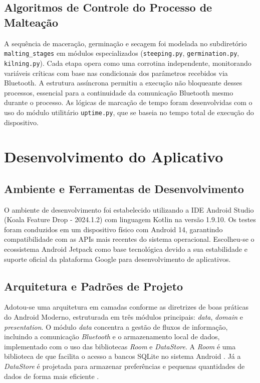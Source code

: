 \subsection{Algoritmos de Controle do Processo de Malteação}
A sequência de maceração, germinação e secagem foi modelada no subdiretório \texttt{malting\_stages} em módulos especializados (\texttt{steeping.py}, \texttt{germination.py}, \texttt{kilning.py}). Cada etapa opera como uma corrotina independente, monitorando variáveis críticas com base nas condicionais dos parâmetros recebidos via Bluetooth. A estrutura assíncrona permitiu a execução não bloqueante desses processos, essencial para a continuidade da comunicação Bluetooth mesmo durante o processo. As lógicas de marcação de tempo foram desenvolvidas com o uso do módulo utilitário \texttt{uptime.py}, que se baseia no tempo total de execução do dispositivo.

\section{Desenvolvimento do Aplicativo}
\subsection{Ambiente e Ferramentas de Desenvolvimento}

O ambiente de desenvolvimento foi estabelecido utilizando a IDE Android Studio (Koala Feature Drop - 2024.1.2) com linguagem Kotlin na versão 1.9.10. Os testes foram conduzidos em um dispositivo físico com Android 14, garantindo compatibilidade com as APIs mais recentes do sistema operacional. Escolheu-se o ecossistema Android Jetpack como base tecnológica devido a sua estabilidade e suporte oficial da plataforma Google para desenvolvimento de aplicativos.

\subsection{Arquitetura e Padrões de Projeto}

Adotou-se uma arquitetura em camadas conforme as diretrizes de boas práticas do Android Moderno, estruturada em três módulos principais: \textit{data}, \textit{domain} e \textit{presentation}. O módulo \textit{data} concentra a gestão de fluxos de informação, incluindo a comunicação \textit{Bluetooth} e o armazenamento local de dados, implementado com o uso das bibliotecas \textit{Room} e \textit{DataStore}. A \textit{Room} é uma biblioteca de que facilita o acesso a bancos SQLite no sistema Android \cite{android_room}. Já a \textit{DataStore} é projetada para armazenar preferências e pequenas quantidades de dados de forma mais eficiente \cite{android_datastore}.

